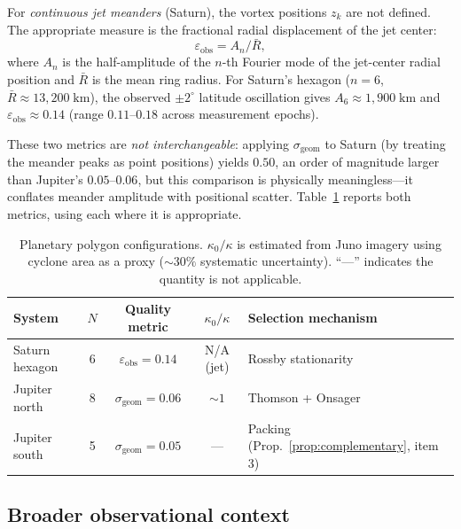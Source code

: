 For \emph{continuous jet meanders} (Saturn), the vortex positions $z_k$
are not defined.  The appropriate measure is the fractional radial
displacement of the jet center:
\begin{equation}\label{eq:eps-obs}
  \varepsilon_{\mathrm{obs}} = A_n / \bar{R},
\end{equation}
where $A_n$ is the half-amplitude of the $n$-th Fourier mode of the
jet-center radial position and $\bar{R}$ is the mean ring radius.
For Saturn's hexagon ($n = 6$, $\bar{R} \approx 13{,}200\;\mathrm{km}$),
the observed $\pm 2^\circ$ latitude oscillation
\citep{Godfrey1988, Antunano2015} gives
$A_6 \approx 1{,}900\;\mathrm{km}$ and
$\varepsilon_{\mathrm{obs}} \approx 0.14$ (range $0.11$--$0.18$ across
measurement epochs).

These two metrics are \emph{not interchangeable}: applying
$\sigma_{\mathrm{geom}}$ to Saturn (by treating the meander peaks as
point positions) yields $0.50$, an order of magnitude larger than
Jupiter's $0.05$--$0.06$, but this comparison is physically
meaningless---it conflates meander amplitude with positional scatter.
Table~\ref{tab:planets} reports both metrics, using each where it is
appropriate.

\begin{table}[htbp]
\centering
\caption{Planetary polygon configurations.
$\kappa_0/\kappa$ is estimated from Juno imagery \citep{Adriani2018}
using cyclone area as a proxy ($\sim\!30\%$ systematic uncertainty).
``---'' indicates the quantity is not applicable.}
\label{tab:planets}
\begin{tabular}{lcccl}
\toprule
System & $N$ & Quality metric &
  $\kappa_0/\kappa$ & Selection mechanism \\
\midrule
Saturn hexagon    & 6 & $\varepsilon_{\mathrm{obs}} = 0.14$ & N/A (jet) & Rossby stationarity \\
Jupiter north     & 8 & $\sigma_{\mathrm{geom}} = 0.06$ & $\sim\!1$ & Thomson + Onsager \\
Jupiter south     & 5 & $\sigma_{\mathrm{geom}} = 0.05$ & --- & Packing (Prop.~\ref{prop:complementary}, item 3) \\
\bottomrule
\end{tabular}
\end{table}

\subsection{Broader observational context}

